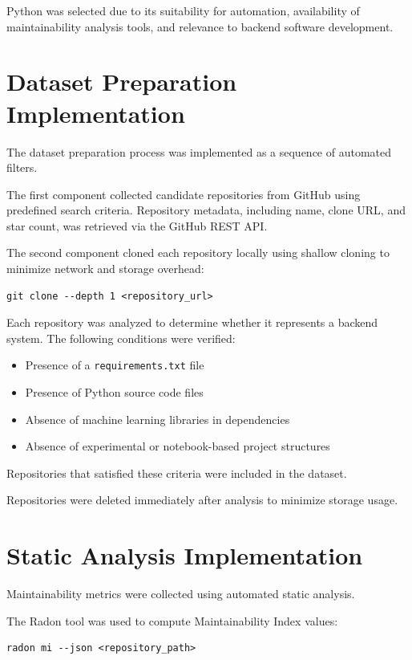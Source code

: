 Python was selected due to its suitability for automation, availability of maintainability analysis tools, and relevance to backend software development.

\section{Dataset Preparation Implementation}

The dataset preparation process was implemented as a sequence of automated filters.

The first component collected candidate repositories from GitHub using predefined search criteria. Repository metadata, including name, clone URL, and star count, was retrieved via the GitHub REST API.

The second component cloned each repository locally using shallow cloning to minimize network and storage overhead:

\begin{verbatim}
git clone --depth 1 <repository_url>
\end{verbatim}

Each repository was analyzed to determine whether it represents a backend system. The following conditions were verified:

\begin{itemize}
\item Presence of a \texttt{requirements.txt} file
\item Presence of Python source code files
\item Absence of machine learning libraries in dependencies
\item Absence of experimental or notebook-based project structures
\end{itemize}

Repositories that satisfied these criteria were included in the dataset.

Repositories were deleted immediately after analysis to minimize storage usage.

\section{Static Analysis Implementation}

Maintainability metrics were collected using automated static analysis.

The Radon tool was used to compute Maintainability Index values:

\begin{verbatim}
radon mi --json <repository_path>
\end{verbatim}

